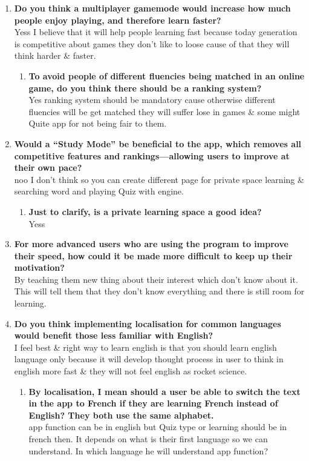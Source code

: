 \documentclass{article}
\begin{document}
\begin{enumerate}
\begin{enumerate}
    \end{enumerate}
    \item \textbf{Do you think a multiplayer gamemode would increase how much people enjoy playing, and therefore learn faster?} \\ Yess I believe that it will help people learning fast because today generation is competitive about games they don't like to loose cause of that they will think harder \& faster.
    \begin{enumerate}
        \item \textbf{To avoid people of different fluencies being matched in an online game, do you think there should be a ranking system?} \\ Yes ranking system should be mandatory cause otherwise different fluencies will be get matched they will suffer lose in games \& some might Quite app for not being fair to them.
    \end{enumerate}
    \item \textbf{Would a “Study Mode” be beneficial to the app, which removes all competitive features and rankings---allowing users to improve at their own pace?} \\ noo I don't think so you can create different page for private space learning \& searching word and playing Quiz with engine.
    \begin{enumerate}
        \item \textbf{Just to clarify, is a private learning space a good idea?} \\ Yess
    \end{enumerate}
    \item \textbf{For more advanced users who are using the program to improve their speed, how could it be made more difficult to keep up their motivation?} \\ By teaching them new thing about their interest which don't know about it. This will tell them that they don't know everything and there is still room for learning.
    \item  \textbf{Do you think implementing localisation for common languages would benefit those less familiar with English?} \\ I feel best \& right way to learn english is that you should learn english language only because it will develop thought process in user to think in english more fast \& they will not feel english as rocket science.
    \begin{enumerate}
        \item \textbf{By localisation, I mean should a user be able to switch the text in the app to French if they are learning French instead of English? They both use the same alphabet.} \\ app function can be in english but Quiz type or learning should be in french then. It depends on what is their first language so we can understand. In which language he will understand app function?

\end{enumerate}
\end{enumerate}
\end{document}
